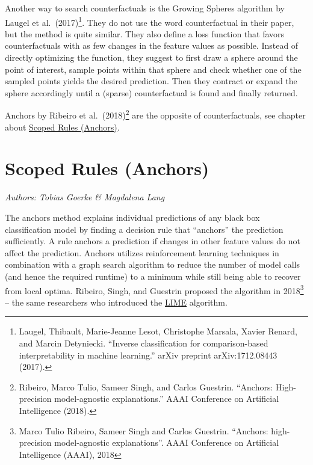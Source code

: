 \documentclass[
  10pt,
]{scrbook}
\begin{document}
Another way to search counterfactuals is the Growing Spheres algorithm by Laugel et al.~(2017)\footnote{Laugel, Thibault, Marie-Jeanne Lesot, Christophe Marsala, Xavier Renard, and Marcin Detyniecki. ``Inverse classification for comparison-based interpretability in machine learning.'' arXiv preprint arXiv:1712.08443 (2017).}.
They do not use the word counterfactual in their paper, but the method is quite similar.
They also define a loss function that favors counterfactuals with as few changes in the feature values as possible.
Instead of directly optimizing the function, they suggest to first draw a sphere around the point of interest, sample points within that sphere and check whether one of the sampled points yields the desired prediction.
Then they contract or expand the sphere accordingly until a (sparse) counterfactual is found and finally returned.

Anchors by Ribeiro et al.~(2018)\footnote{Ribeiro, Marco Tulio, Sameer Singh, and Carlos Guestrin. ``Anchors: High-precision model-agnostic explanations.'' AAAI Conference on Artificial Intelligence (2018).} are the opposite of counterfactuals, see chapter about \protect\hyperlink{anchors}{Scoped Rules (Anchors)}.

\newpage

\hypertarget{anchors}{%
\section{Scoped Rules (Anchors)}\label{anchors}}

\emph{Authors: Tobias Goerke \& Magdalena Lang}

The anchors method explains individual predictions of any black box classification model by finding a decision rule that ``anchors'' the prediction sufficiently.
A rule anchors a prediction if changes in other feature values do not affect the prediction.
Anchors utilizes reinforcement learning techniques in combination with a graph search algorithm to reduce the number of model calls (and hence the required runtime) to a minimum while still being able to recover from local optima. Ribeiro, Singh, and Guestrin proposed the algorithm in 2018\footnote{Marco Tulio Ribeiro, Sameer Singh and Carlos Guestrin. ``Anchors: high-precision model-agnostic explanations''. AAAI Conference on Artificial Intelligence (AAAI), 2018} -- the same researchers who introduced the \protect\hyperlink{lime}{LIME} algorithm.
\end{document}
